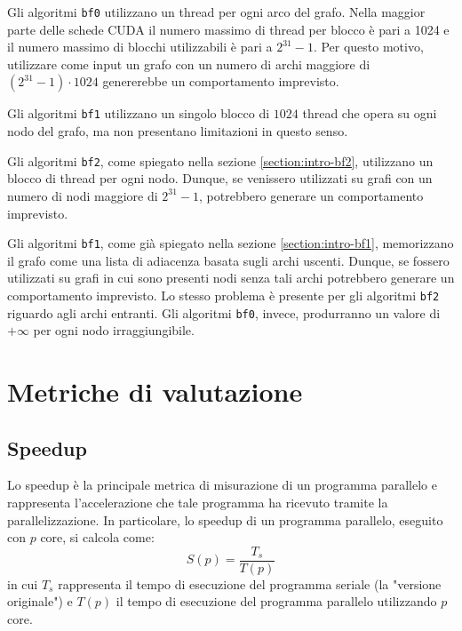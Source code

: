 \documentclass[12pt,a4paper,oneside]{book}
\begin{document}
	Gli algoritmi \texttt{bf0} utilizzano un thread per ogni arco del grafo. Nella maggior parte delle schede CUDA il numero massimo di thread per blocco è pari a 1024 e il numero massimo di blocchi utilizzabili è pari a $2^{31}-1$\cite{cudaSpecifications}. Per questo motivo, utilizzare come input un grafo con un numero di archi maggiore di $(2^{31}-1)\cdot 1024$ genererebbe un comportamento imprevisto.
	
	Gli algoritmi \texttt{bf1} utilizzano un singolo blocco di $1024$ thread che opera su ogni nodo del grafo, ma non presentano limitazioni in questo senso.
	
	Gli algoritmi \texttt{bf2}, come spiegato nella sezione \ref{section:intro-bf2}, utilizzano un blocco di thread per ogni nodo. Dunque, se venissero utilizzati su grafi con un numero di nodi maggiore di $2^{31}-1$, potrebbero generare un comportamento imprevisto.
	
	Gli algoritmi \texttt{bf1}, come già spiegato nella sezione \ref{section:intro-bf1}, memorizzano il grafo come una lista di adiacenza basata sugli archi uscenti. Dunque, se fossero utilizzati su grafi in cui sono presenti nodi senza tali archi potrebbero generare un comportamento imprevisto. Lo stesso problema è presente per gli algoritmi \texttt{bf2} riguardo agli archi entranti. Gli algoritmi \texttt{bf0}, invece, produrranno un valore di $+\infty$ per ogni nodo irraggiungibile.
	
	\chapter{Metriche di valutazione}
	\label{chap:metriche}
	\section{Speedup}
	Lo speedup è la principale metrica di misurazione di un programma parallelo e rappresenta l'accelerazione che tale programma ha ricevuto tramite la parallelizzazione. In particolare, lo speedup di un programma parallelo, eseguito con $p$ core, si calcola come:
	\begin{equation}
		S(p) = \frac{T_s}{T(p)}
		\label{eq:speedup}
	\end{equation}
	in cui $T_s$ rappresenta il tempo di esecuzione del programma seriale (la "versione originale") e $T(p)$ il tempo di esecuzione del programma parallelo utilizzando $p$ core.
	
\end{document}
